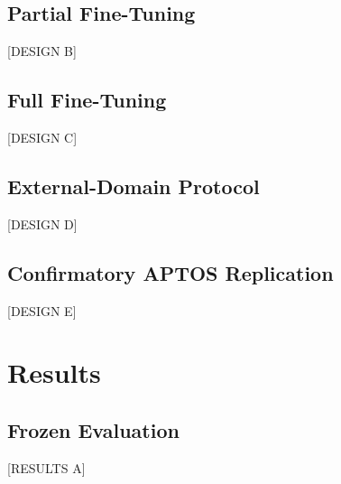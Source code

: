 \documentclass[journal]{IEEEtran}
\begin{document}
\subsection{Partial Fine-Tuning}
[DESIGN B]

\subsection{Full Fine-Tuning}
[DESIGN C]

\subsection{External-Domain Protocol}
[DESIGN D]

\subsection{Confirmatory APTOS Replication}
%
[DESIGN E]

\section{Results}

\subsection{Frozen Evaluation}
[RESULTS A]
\end{document}
